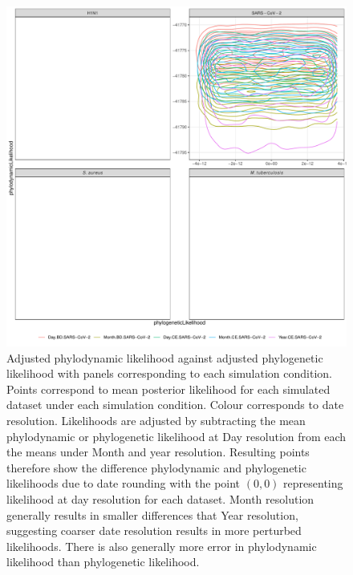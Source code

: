 \documentclass[11pt]{article}
\begin{document}
\begin{figure}[H]
    \centering
    \includegraphics[width=\textwidth]{simulation_likelihood.pdf}
    \caption{Adjusted phylodynamic likelihood against adjusted phylogenetic likelihood with panels corresponding to each simulation condition. Points correspond to mean posterior likelihood for each simulated dataset under each simulation condition. Colour corresponds to date resolution. Likelihoods are adjusted by subtracting the mean phylodynamic or phylogenetic likelihood at Day resolution from each the means under Month and year resolution. Resulting points therefore show the difference phylodynamic and phylogenetic likelihoods due to date rounding with the point $(0, 0)$ representing likelihood at day resolution for each dataset. Month resolution generally results in smaller differences that Year resolution, suggesting coarser date resolution results in more perturbed likelihoods. There is also generally more error in phylodynamic likelihood than phylogenetic likelihood.}
    \label{fig:sim-likeihood}
\end{figure}
\end{document}

